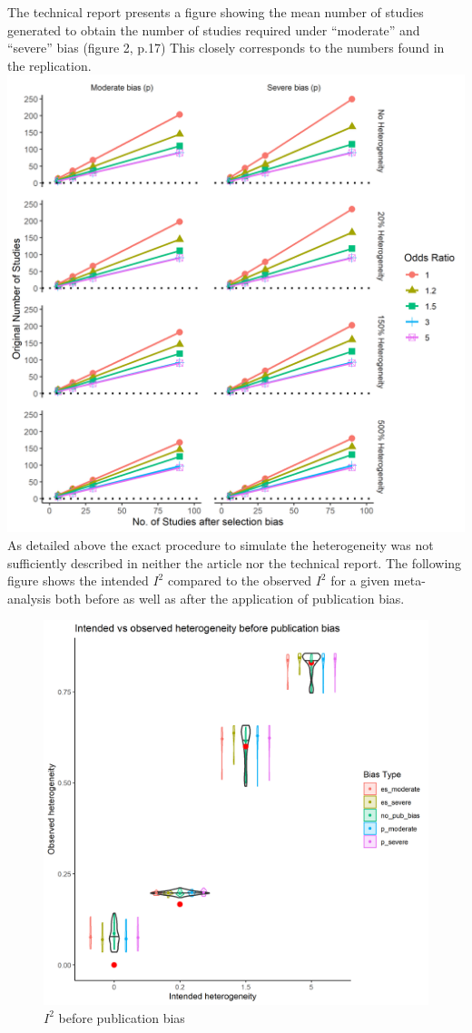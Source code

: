 \documentclass[
  english,
  doc,floatsintext,draftall]{apa6}
\begin{document}
The technical report presents a figure showing the mean number of studies generated to obtain the number of studies required under \enquote{moderate} and \enquote{severe} bias (figure 2, p.17)
This closely corresponds to the numbers found in the replication.
\includegraphics{../figures/studies_generated.png}
As detailed above the exact procedure to simulate the heterogeneity was not sufficiently described in neither the article nor the technical report. The following figure shows the intended \(I^2\) compared to the observed \(I^2\) for a given meta-analysis both before as well as after the application of publication bias.

\begin{figure}
 \includegraphics[width=400pt]{../figures/i_squared_unbiased} \caption{$I^2$ before publication bias}\label{fig:unnamed-chunk-1}
 \end{figure}
\end{document}
